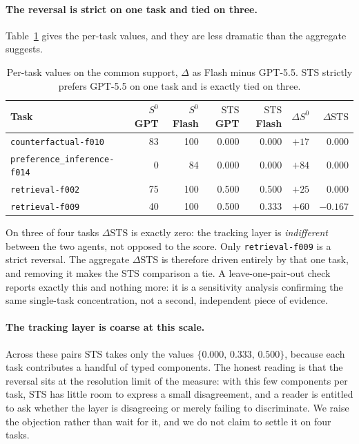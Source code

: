 \documentclass{article}
\newcommand{\task}[1]{\texttt{#1}}
\newcommand{\STS}{\mathrm{STS}}
\begin{document}
\paragraph{The reversal is strict on one task and tied on three.}
Table~\ref{tab:pertask} gives the per-task values, and they are less dramatic than the aggregate suggests.

\begin{table}[t]
\centering
\small
\caption{Per-task values on the common support, $\Delta$ as Flash minus GPT-5.5. $\STS$ strictly prefers GPT-5.5 on one task and is exactly tied on three.}
\label{tab:pertask}
\begin{tabular}{lrrrrrr}
\toprule
Task & $S^{0}$ GPT & $S^{0}$ Flash & $\STS$ GPT & $\STS$ Flash & $\Delta S^{0}$ & $\Delta\STS$ \\
\midrule
\task{counterfactual-f010}        & 83 & 100 & 0.000 & 0.000 & $+17$ & $0.000$ \\
\task{preference\_inference-f014} &  0 &  84 & 0.000 & 0.000 & $+84$ & $0.000$ \\
\task{retrieval-f002}             & 75 & 100 & 0.500 & 0.500 & $+25$ & $0.000$ \\
\task{retrieval-f009}             & 40 & 100 & 0.500 & 0.333 & $+60$ & $-0.167$ \\
\bottomrule
\end{tabular}
\end{table}

On three of four tasks $\Delta\STS$ is exactly zero: the tracking layer is \emph{indifferent} between the two agents, not opposed to the score.
Only \task{retrieval-f009} is a strict reversal.
The aggregate $\Delta\STS$ is therefore driven entirely by that one task, and removing it makes the $\STS$ comparison a tie.
A leave-one-pair-out check reports exactly this and nothing more: it is a sensitivity analysis confirming the same single-task concentration, not a second, independent piece of evidence.

\paragraph{The tracking layer is coarse at this scale.}
Across these pairs $\STS$ takes only the values $\{0.000,\,0.333,\,0.500\}$, because each task contributes a handful of typed components.
The honest reading is that the reversal sits at the resolution limit of the measure: with this few components per task, $\STS$ has little room to express a small disagreement, and a reader is entitled to ask whether the layer is disagreeing or merely failing to discriminate.
We raise the objection rather than wait for it, and we do not claim to settle it on four tasks.
\end{document}
